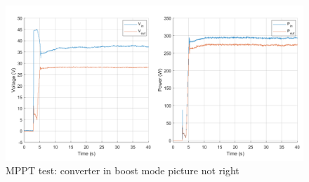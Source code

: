 \begin{figure}[H]
	\begin{center}
		\includegraphics[width=1\textwidth]{../Pictures/P1/Test/Buck_mode_MPPT_Vin_Vout_Pin_Pout}
		\caption{MPPT test: converter in boost mode picture not right}
		\label{MPPTtestboostmode2}
	\end{center}	
\end{figure}




